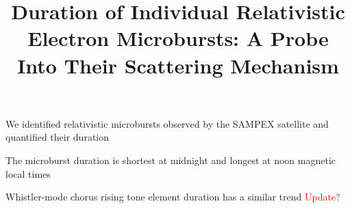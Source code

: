 \documentclass[draft]{agujournal2019}
\begin{document}
%
%



\title{Duration of Individual Relativistic Electron Microbursts: A Probe Into Their Scattering Mechanism}






\begin{keypoints}
\item We identified relativistic microbursts observed by the SAMPEX satellite and quantified their duration
\item The microburst duration is shortest at midnight and longest at noon magnetic local times
\item Whistler-mode chorus rising tone element duration has a similar trend \textcolor{red}{Update?}
\end{keypoints}

%
%

%
%
\end{document}
